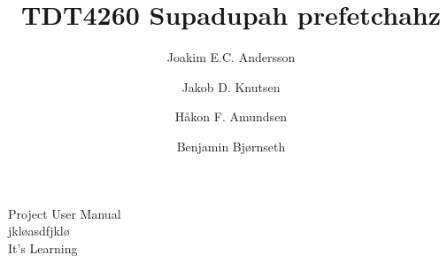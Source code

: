 \documentclass[journal]{IEEEtran/IEEEtran}
\title{TDT4260 Supadupah prefetchahz}
\author{Joakim E.C. Andersson \and Jakob D. Knutsen \and Håkon F. Amundsen \and Benjamin Bjørnseth}
\begin{document}
\maketitle











\begin{thebibliography}{9}

Project User Manual\\
jkløasdfjklø\\
It's Learning

\end{thebibliography}
\end{document}
